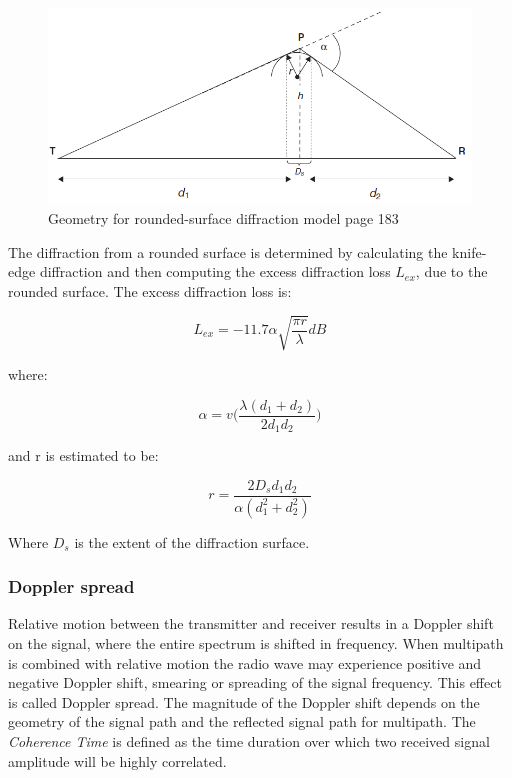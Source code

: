 \begin{figure}[h]
\hspace{0.5cm}
\includegraphics[scale=0.7]{figures/RoundedDiffraction.PNG}
\caption{Geometry for rounded-surface diffraction model\cite{RFpropagation} page 183}
\end{figure}

The diffraction from a rounded surface is determined by calculating the knife-edge diffraction and then computing the excess diffraction loss $L_{ex}$, due to the rounded surface. The excess diffraction loss is:

\begin{equation}
    L_{ex} = -11.7 \alpha\sqrt{\frac{\pi r}{\lambda}} dB
\end{equation}

where:

\begin{equation}
    \alpha = v\Big(\frac{\lambda(d_1+d_2)}{2d_1d_2}\Big)
\end{equation}

and r is estimated to be:

\begin{equation}
    r = \frac{2D_sd_1d_2}{\alpha(d_1^2+d_2^2)}
\end{equation}

Where $D_s$ is the extent of the diffraction surface. 

\subsubsection{Doppler spread}
Relative motion between the transmitter and receiver results in a Doppler shift\cite{DopplerShift} on the signal, where the entire spectrum is shifted in frequency. When multipath is combined with relative motion the radio wave may experience positive and negative Doppler shift, smearing or spreading of the signal frequency. This effect is called Doppler spread. The magnitude of the Doppler shift depends on the geometry of the signal path and the reflected signal path for multipath. The  \textit{Coherence Time} is defined as the time duration over which two received signal amplitude will be highly correlated.

